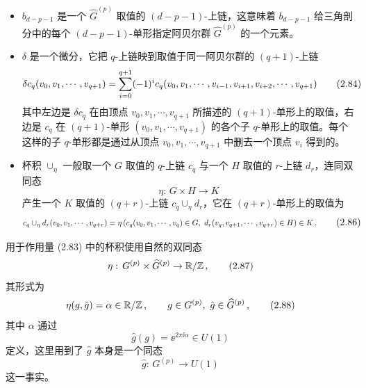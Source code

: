 \begin{itemize}[leftmargin=1.4em,itemsep=1pt,topsep=1pt]
\item $b_{d-p-1}$ 是一个 $\widehat{G}^{(p)}$ 取值的 $(d-p-1)$-上链，这意味着 $b_{d-p-1}$ 给三角剖分中的每个 $(d-p-1)$-单形指定阿贝尔群 $\widehat{G}^{(p)}$ 的一个元素。
\item $\delta$ 是一个微分，它把 $q$-上链映到取值于同一阿贝尔群的 $(q+1)$-上链
\begin{equation}
  \resizebox{0.88\textwidth}{!}{$\displaystyle \delta c_q(v_0,v_1,\cdots,v_{q+1}) = \sum_{i=0}^{q+1}(-1)^i c_q(v_0,v_1,\cdots,v_{i-1},v_{i+1},v_{i+2},\cdots,v_{q+1})$} \tag{2.84}
\end{equation}
其中左边是 $\delta c_q$ 在由顶点 $v_0,v_1,\cdots,v_{q+1}$ 所描述的 $(q+1)$-单形上的取值，右边是 $c_q$ 在 $(q+1)$-单形 $(v_0,v_1,\cdots,v_{q+1})$ 的各个子 $q$-单形上的取值。每个这样的子 $q$-单形都是通过从顶点 $v_0,v_1,\cdots,v_{q+1}$ 中删去一个顶点 $v_i$ 得到的。
\item 杯积 $\cup_\eta$ 一般取一个 $G$ 取值的 $q$-上链 $c_q$ 与一个 $H$ 取值的 $r$-上链 $d_r$，连同双同态
\begin{equation}
  \eta:\,G\times H\to K \tag{2.85}
\end{equation}
产生一个 $K$ 取值的 $(q+r)$-上链 $c_q\cup_\eta d_r$，它在 $(q+r)$-单形上的取值为
\begin{equation}
  \resizebox{0.88\textwidth}{!}{$\displaystyle c_q\cup_\eta d_r(v_0,v_1,\cdots,v_{q+r}) = \eta\left(c_q(v_0,v_1,\cdots,v_q)\in G,\ d_r(v_q,v_{q+1},\cdots,v_{q+r})\in H\right)\in K\,.$} \tag{2.86}
\end{equation}
\end{itemize}

用于作用量 (2.83) 中的杯积使用自然的双同态
\begin{equation}
  \eta:\,G^{(p)}\times\widehat{G}^{(p)}\to\mathbb{R}/\mathbb{Z}\,, \tag{2.87}
\end{equation}
其形式为
\begin{equation}
  \eta(g,\hat{g}) = \alpha\in\mathbb{R}/\mathbb{Z}\,,\qquad g\in G^{(p)},\ \hat{g}\in\widehat{G}^{(p)}\,, \tag{2.88}
\end{equation}
其中 $\alpha$ 通过
\begin{equation}
  \hat{g}(g) = \ee^{2\pi\ii\alpha}\in U(1) \tag{2.89}
\end{equation}
定义，这里用到了 $\hat{g}$ 本身是一个同态
\begin{equation}
  \hat{g}:\,G^{(p)}\to U(1) \tag{2.90}
\end{equation}
这一事实。

